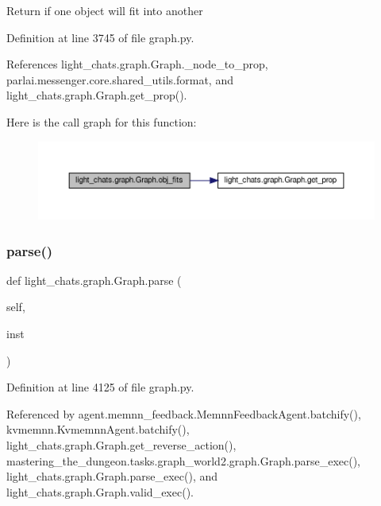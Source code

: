 \begin{DoxyVerb}Return if one object will fit into another\end{DoxyVerb}
 

Definition at line 3745 of file graph.\+py.



References light\+\_\+chats.\+graph.\+Graph.\+\_\+node\+\_\+to\+\_\+prop, parlai.\+messenger.\+core.\+shared\+\_\+utils.\+format, and light\+\_\+chats.\+graph.\+Graph.\+get\+\_\+prop().

Here is the call graph for this function\+:
\nopagebreak
\begin{figure}[H]
\begin{center}
\leavevmode
\includegraphics[width=350pt]{classlight__chats_1_1graph_1_1Graph_af7460b9c8069563289b8b6b11f831b63_cgraph}
\end{center}
\end{figure}
\mbox{\label{classlight__chats_1_1graph_1_1Graph_a5087252eb40253eacd115e777c092cd8}} 
\subsubsection{\texorpdfstring{parse()}{parse()}}
{\footnotesize\ttfamily def light\+\_\+chats.\+graph.\+Graph.\+parse (\begin{DoxyParamCaption}\item[{}]{self,  }\item[{}]{inst }\end{DoxyParamCaption})}



Definition at line 4125 of file graph.\+py.



Referenced by agent.\+memnn\+\_\+feedback.\+Memnn\+Feedback\+Agent.\+batchify(), kvmemnn.\+Kvmemnn\+Agent.\+batchify(), light\+\_\+chats.\+graph.\+Graph.\+get\+\_\+reverse\+\_\+action(), mastering\+\_\+the\+\_\+dungeon.\+tasks.\+graph\+\_\+world2.\+graph.\+Graph.\+parse\+\_\+exec(), light\+\_\+chats.\+graph.\+Graph.\+parse\+\_\+exec(), and light\+\_\+chats.\+graph.\+Graph.\+valid\+\_\+exec().

